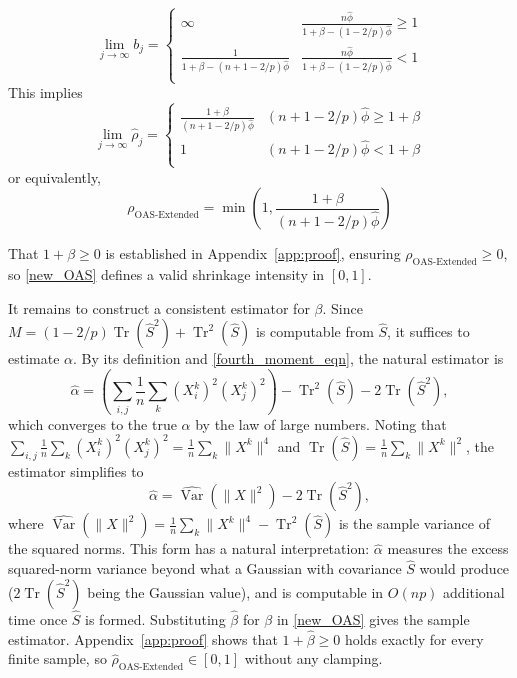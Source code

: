 \documentclass[10pt,twoside,titlepage]{article}
\begin{document}
\begin{equation}
  \lim_{j \to \infty} b_j =
    \begin{cases}
      \infty & \frac{  n \hat{\phi} }{ 1 + \beta - (1-2/p) \hat{\phi} } \geq  1 \\
      \frac{1}{1 + \beta - (n+1-2/p) \hat{\phi} }      & \frac{  n \hat{\phi} }{ 1 + \beta - (1-2/p) \hat{\phi} } < 1 \\
    \end{cases}
\end{equation}
This implies
\begin{equation}
  \lim_{j \to \infty} \hat{\rho}_j =
    \begin{cases}
      \frac{ 1 + \beta }{ (n+1-2/p) \hat{\phi} } & (n+1-2/p) \hat{\phi} \geq 1 + \beta \\
      1                                          & (n+1-2/p) \hat{\phi} < 1 + \beta \\
    \end{cases}
\end{equation}
or equivalently,
\begin{equation}
\label{new_OAS}
\rho_{\text{OAS-Extended}} = \min\left( 1, \frac{ 1 + \beta }{ (n+1-2/p) \hat{\phi} } \right)
\end{equation}

That $1 + \beta \geq 0$ is established in Appendix~\ref{app:proof}, ensuring $\rho_{\text{OAS-Extended}} \geq 0$,
so \eqref{new_OAS} defines a valid shrinkage intensity in $[0,1]$.

It remains to construct a consistent estimator for $\beta$.
Since $M = (1-2/p) \operatorname{Tr}( \hat{S}^2 ) + \operatorname{Tr}^2( \hat{S} )$ is computable from $\hat{S}$, it suffices to estimate $\alpha$.
By its definition and \eqref{fourth_moment_eqn}, the natural estimator is
\begin{equation}
\hat{\alpha} = \left( \sum_{i,j} \frac{1}{n} \sum_k (X_i^k)^2 (X_j^k)^2 \right) - \operatorname{Tr}^2(\hat{S}) - 2 \operatorname{Tr}(\hat{S}^2),
\end{equation}
which converges to the true $\alpha$ by the law of large numbers.
Noting that $\sum_{i,j}\frac{1}{n}\sum_k (X_i^k)^2(X_j^k)^2 = \frac{1}{n}\sum_k \lVert X^k \rVert^4$
and $\operatorname{Tr}(\hat{S}) = \frac{1}{n}\sum_k \lVert X^k \rVert^2$, the estimator simplifies to
\begin{equation}
\hat{\alpha} = \widehat{\operatorname{Var}}\!\left(\lVert X \rVert^2\right) - 2\operatorname{Tr}(\hat{S}^2),
\end{equation}
where $\widehat{\operatorname{Var}}(\lVert X \rVert^2) = \frac{1}{n}\sum_k \lVert X^k \rVert^4 - \operatorname{Tr}^2(\hat{S})$
is the sample variance of the squared norms.
This form has a natural interpretation: $\hat{\alpha}$ measures the excess squared-norm
variance beyond what a Gaussian with covariance $\hat{S}$ would produce
($2\operatorname{Tr}(\hat{S}^2)$ being the Gaussian value), and is computable in $O(np)$
additional time once $\hat{S}$ is formed.
Substituting $\hat{\beta}$ for $\beta$ in \eqref{new_OAS} gives the sample estimator.
Appendix~\ref{app:proof} shows that $1 + \hat{\beta} \geq 0$ holds exactly for
every finite sample, so $\hat{\rho}_{\text{OAS-Extended}} \in [0,1]$ without any clamping.
\end{document}
